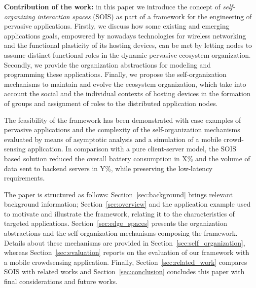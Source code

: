 \textbf{Contribution of the work:} 
in this paper we introduce the concept of \textit{self-organizing interaction spaces} (SOIS) as part of a framework for the engineering of pervasive applications. 
Firstly, we discuss how some existing and emerging applications goals, empowered by nowadays technologies for wireless networking and the functional plasticity of its hosting devices, can be met by letting nodes to assume distinct functional roles in the dynamic pervasive ecosystem organization. 
Secondly, we provide the organization abstractions for modeling and programming these applications. Finally, we propose the self-organization mechanisms to maintain and evolve the ecosystem organization, which take into account the social and the individual contexts of hosting devices in the formation of groups and assignment of roles to the  distributed application nodes.

The feasibility of the framework has been demonstrated with case examples of pervasive applications and the complexity of the self-organization mechanisms evaluated by means of asymptotic analysis and a simulation of a mobile crowd-sensing application.
In comparison with a pure client-server model, the SOIS based solution reduced the overall battery consumption in X\% and the volume of data sent to backend servers in Y\%, while preserving the low-latency requirements.

The paper is structured as follows: Section~\ref{sec:background} brings relevant background information; Section~\ref{sec:overview} and the application example used to motivate and illustrate the framework, relating it to the characteristics of targeted applications. Section~\ref{sec:edge_spaces} presents the organization abstractions and the self-organization mechanisms composing the framework. Details about these mechanisms are provided in Section~\ref{sec:self_organization}, whereas Section~\ref{sec:evaluation} reports on the evaluation of our framework with a mobile crowdsensing application. Finally, Section~\ref{sec:related_work} compares SOIS with related works and Section~\ref{sec:conclusion} concludes this paper with final considerations and future works.
